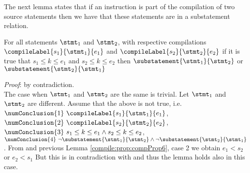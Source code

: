 The next lemma states that if an instruction is part of the compilation 
of two source statements then we have that these statements are in a substatement relation. 

\begin{compPropApp}\label{compile:prop:commonInstr}
   For all statements $\stmt_1$ and $\stmt_2$, with respective compilations 
   $\compileLabel{s_1}{\stmt_1}{e_1}$ and  $\compileLabel{s_2}{\stmt_2}{e_2}$ if it is true that 
   $s_1 \le k \le e_1 $ and $ s_2 \le k \le e_2$ then
   $ \substatement{\stmt_1}{\stmt_2}$ or   $ \substatement{\stmt_2}{\stmt_1}$
   
\end{compPropApp}
\textit{Proof}: by contradiction.\\
The case when  $\stmt_1$ and $\stmt_2$ are the same is trivial.
Let $\stmt_1$ and $\stmt_2$ are different.
Assume that the above is not true, i.e. 
$\numConclusion{1} \ \compileLabel{s_1}{\stmt_1}{e_1}  $,
$\numConclusion{2} \ \compileLabel{s_2}{\stmt_2}{e_2}$, 
$\numConclusion{3} \ s_1 \le k \le e_1 \wedge  s_2 \le k \le e_2$, 
$\numConclusion{4} \  \neg \substatement{\stmt_1}{\stmt_2} \wedge \neg   \substatement{\stmt_2}{\stmt_1} $.
From   and previous Lemma \ref{compile:prop:compProp6}, case 2 we obtain $e_1 < s_2  $ or $ e_2 < s_1$
But this is in contradiction with  and thus the lemma holds also in this case.

\Qed\\





%


